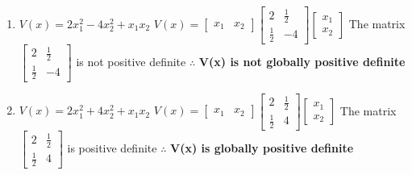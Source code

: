 \documentclass{article}
\begin{document}
\begin{enumerate}[label=(\roman*)]
 
   \item $V(x) = 2x_1^2 - 4x_2^2 + x_1x_2$ \newline \newline
       $V(x) = \begin{bmatrix}
                x_1 & x_2
              \end{bmatrix}
              \begin{bmatrix}
                2 & \frac{1}{2} \\
                \frac{1}{2} & -4 
              \end{bmatrix}
              \begin{bmatrix}
                x_1 \\
                x_2
              \end{bmatrix}$
      The matrix $\begin{bmatrix}
                2 & \frac{1}{2} \\
                \frac{1}{2} & -4
              \end{bmatrix}$ is not positive definite \newline \newline
      $\therefore$ \textbf{V(x) is not globally positive definite} \newline
 
   \item $V(x) = 2x_1^2 + 4x_2^2 + x_1x_2$ \newline \newline
       $V(x) = \begin{bmatrix}
                x_1 & x_2
              \end{bmatrix}
              \begin{bmatrix}
                2 & \frac{1}{2} \\
                \frac{1}{2} & 4 
              \end{bmatrix}
              \begin{bmatrix}
                x_1 \\
                x_2
              \end{bmatrix}$
      The matrix $\begin{bmatrix}
                2 & \frac{1}{2} \\
                \frac{1}{2} & 4
              \end{bmatrix}$ is positive definite \newline \newline
      $\therefore$ \textbf{V(x) is globally positive definite} \newline
 

\end{enumerate}
\end{document}
